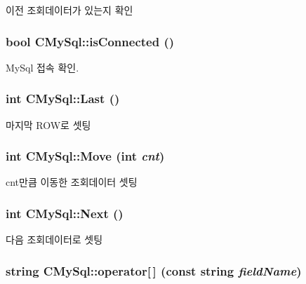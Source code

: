 이전 조회데이터가 있는지 확인 \hypertarget{classCMySql_a5be8786b07864ba655ef55378f66ada7}{
\subsubsection[{isConnected}]{\setlength{\rightskip}{0pt plus 5cm}bool CMySql::isConnected ()}}
\label{classCMySql_a5be8786b07864ba655ef55378f66ada7}


MySql 접속 확인. \hypertarget{classCMySql_af8409e3cd8cb029fa1823efe99e7524b}{
\subsubsection[{Last}]{\setlength{\rightskip}{0pt plus 5cm}int CMySql::Last ()}}
\label{classCMySql_af8409e3cd8cb029fa1823efe99e7524b}


마지막 ROW로 셋팅 \hypertarget{classCMySql_a92ff6e04a1a7985494e948884d4ab8fb}{
\subsubsection[{Move}]{\setlength{\rightskip}{0pt plus 5cm}int CMySql::Move (int {\em cnt})}}
\label{classCMySql_a92ff6e04a1a7985494e948884d4ab8fb}


cnt만큼 이동한 조회데이터 셋팅 \hypertarget{classCMySql_ab68631ceb288121957589643cd096757}{
\subsubsection[{Next}]{\setlength{\rightskip}{0pt plus 5cm}int CMySql::Next ()}}
\label{classCMySql_ab68631ceb288121957589643cd096757}


다음 조회데이터로 셋팅 \hypertarget{classCMySql_ab282013a24a7629a8fbfd5520e13bf0e}{
\subsubsection[{operator[]}]{\setlength{\rightskip}{0pt plus 5cm}string CMySql::operator\mbox{[}$\,$\mbox{]} (const string {\em fieldName})}}
\label{classCMySql_ab282013a24a7629a8fbfd5520e13bf0e}




